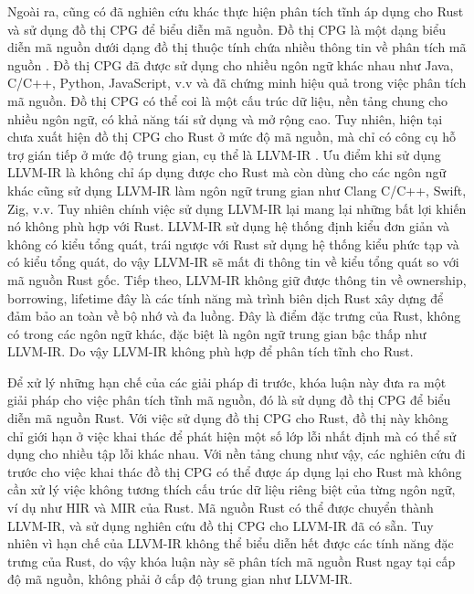 Ngoài ra, cũng có đã nghiên cứu khác thực hiện phân tích tĩnh áp dụng cho Rust và sử dụng đồ thị CPG để biểu diễn mã nguồn.
Đồ thị CPG là một dạng biểu diễn mã nguồn dưới dạng đồ thị thuộc tính chứa nhiều thông tin về phân tích mã nguồn \cite{yamaguchi2014modeling}.
Đồ thị CPG đã được sử dụng cho nhiều ngôn ngữ khác nhau như Java, C/C++, Python, JavaScript, v.v và đã chứng minh hiệu quả trong việc phân tích mã nguồn.
Đồ thị CPG có thể coi là một cấu trúc dữ liệu, nền tảng chung cho nhiều ngôn ngữ, có khả năng tái sử dụng và mở rộng cao.
Tuy nhiên, hiện tại chưa xuất hiện đồ thị CPG cho Rust ở mức độ mã nguồn, mà chỉ có công cụ hỗ trợ gián tiếp ở mức độ trung gian, cụ thể là LLVM-IR \cite{kuchler2022representing}.
Ưu điểm khi sử dụng LLVM-IR \cite{lattner2004llvm} là không chỉ áp dụng được cho Rust mà còn dùng cho các ngôn ngữ khác cũng sử dụng LLVM-IR làm ngôn ngữ trung gian như Clang C/C++, Swift, Zig, v.v.
Tuy nhiên chính việc sử dụng LLVM-IR lại mang lại những bất lợi khiến nó không phù hợp với Rust.
LLVM-IR sử dụng hệ thống định kiểu đơn giản và không có kiểu tổng quát, trái ngược với Rust sử dụng hệ thống kiểu phức tạp và có kiểu tổng quát, do vậy LLVM-IR sẽ mất đi thông tin về kiểu tổng quát so với mã nguồn Rust gốc.
Tiếp theo, LLVM-IR không giữ được thông tin về ownership, borrowing, lifetime đây là các tính năng mà trình biên dịch Rust xây dựng để đảm bảo an toàn về bộ nhớ và đa luồng.
Đây là điểm đặc trưng của Rust, không có trong các ngôn ngữ khác, đặc biệt là ngôn ngữ trung gian bậc thấp như LLVM-IR.
Do vậy LLVM-IR không phù hợp để phân tích tĩnh cho Rust.


Để xử lý những hạn chế của các giải pháp đi trước, khóa luận này đưa ra một giải pháp cho việc phân tích tĩnh mã nguồn, đó là sử dụng đồ thị CPG để biểu diễn mã nguồn Rust.
Với việc sử dụng đồ thị CPG cho Rust, đồ thị này không chỉ giới hạn ở việc khai thác để phát hiện một số lớp lỗi nhất định mà có thể sử dụng cho nhiều tập lỗi khác nhau.
Với nền tảng chung như vậy, các nghiên cứu đi trước cho việc khai thác đồ thị CPG có thể được áp dụng lại cho Rust mà không cần xử lý việc không tương thích cấu trúc dữ liệu riêng biệt của từng ngôn ngữ, ví dụ như HIR và MIR của Rust.
Mã nguồn Rust có thể được chuyển thành LLVM-IR, và sử dụng nghiên cứu đồ thị CPG cho LLVM-IR đã có sẵn.
Tuy nhiên vì hạn chế của LLVM-IR không thể biểu diễn hết được các tính năng đặc trưng của Rust, do vậy khóa luận này sẽ phân tích mã nguồn Rust ngay tại cấp độ mã nguồn, không phải ở cấp độ trung gian như LLVM-IR.

